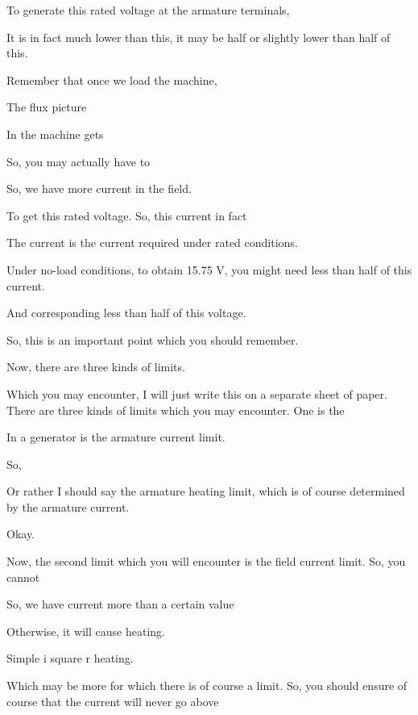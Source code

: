 \documentclass{article}
\begin{document}
To generate this rated voltage at the armature terminals,

It is in fact much lower than this, it may be half or slightly lower than half of this.

Remember that once we load the machine,

The flux picture

In the machine gets

So, you may actually have to

So, we have more current in the field.

To get this rated voltage. So, this current in fact

The current is the current required under rated conditions.

Under no-load conditions, to obtain 15.75 V, you might need less than half of this current.

And corresponding less than half of this voltage.

So, this is an important point which you should remember.

Now, there are three kinds of limits.

Which you may encounter, I will just write this on a separate sheet of paper. There are three kinds of limits which you may encounter. One is the

In a generator is the armature current limit.

So,

Or rather I should say the armature heating limit, which is of course determined by the armature current.

Okay.

Now, the second limit which you will encounter is the field current limit. So, you cannot

So, we have current more than a certain value

Otherwise, it will cause heating.

Simple i square r heating.

Which may be more for which there is of course a limit. So, you should ensure of course that the current will never go above
\end{document}
